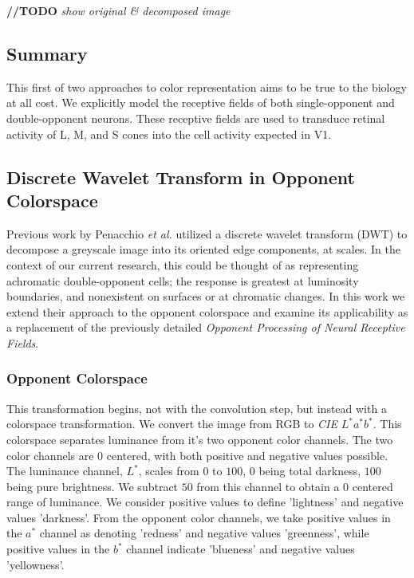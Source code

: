 \documentclass[journal,onecolumn]{IEEEtran}
\begin{document}
\textbf{//TODO} \textit{show original \& decomposed image}


\subsection*{Summary}

This first of two approaches to color representation aims to be true to the biology at all cost. We explicitly model the receptive fields of both single-opponent and double-opponent neurons. These receptive fields are used to transduce retinal activity of L, M, and S cones into the cell activity expected in V1.


\subsection{Discrete Wavelet Transform in Opponent Colorspace}

Previous work by Penacchio \textit{et al.} \cite{otazu:plosive} utilized a discrete wavelet transform (DWT) to decompose a greyscale image into its oriented edge components, at scales. In the context of our current research, this could be thought of as representing achromatic double-opponent cells; the response is greatest at luminosity boundaries, and nonexistent on surfaces or at chromatic changes. In this work we extend their approach to the opponent colorspace and examine its applicability as a replacement of the previously detailed \textit{Opponent Processing of Neural Receptive Fields}.

\subsubsection*{Opponent Colorspace}
This transformation begins, not with the convolution step, but instead with a colorspace transformation. We convert the image from RGB to \textit{CIE} $L^*a^*b^*$. This colorspace separates luminance from it's two opponent color channels. The two color channels are $0$ centered, with both positive and negative values possible. The luminance channel, $L^*$, scales from $0$ to $100$, $0$ being total darkness, $100$ being pure brightness. We subtract $50$ from this channel to obtain a $0$ centered range of luminance. We consider positive values to define 'lightness' and negative values 'darkness'. From the opponent color channels, we take positive values in the $a^*$ channel as denoting 'redness' and negative values 'greenness', while positive values in the $b^*$ channel indicate 'blueness' and negative values 'yellowness'.
\end{document}
